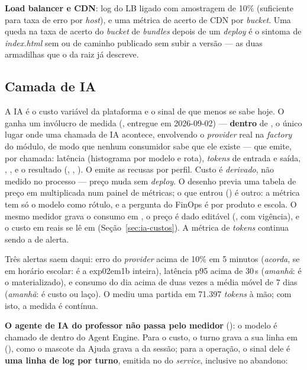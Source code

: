 \textbf{Load balancer e CDN}: log do LB ligado com amostragem de 10\%
(suficiente para taxa de erro por \emph{host}), e uma métrica de acerto de
CDN por \emph{bucket}. Uma queda na taxa de acerto do \emph{bucket} de
\emph{bundles} depois de um \emph{deploy} é o sintoma de \emph{index.html}
sem  ou de caminho publicado sem subir a versão --- as
duas armadilhas que o  da raiz já descreve.

\subsection{Camada de IA}

A IA é o custo variável da plataforma e o sinal de que menos se sabe hoje.
O  ganha um invólucro de medida (,
entregue em 2026-09-02) --- \textbf{dentro} de , o único
lugar onde uma chamada de IA acontece, envolvendo o \emph{provider} real na
\emph{factory} do módulo, de modo que nenhum consumidor sabe que ele existe
--- que emite, por chamada: latência (histograma por modelo e rota), \emph{tokens}
de entrada e saída, , ,  e o
resultado (, , ). O 
emite as recusas por perfil. Custo é \emph{derivado}, não medido no processo
--- preço muda sem \emph{deploy}. O desenho previa uma tabela de preço em
 multiplicada num painel de métricas; o que entrou
() é outro: a métrica tem só o modelo como rótulo, e a pergunta
do FinOps é por produto e escola. O mesmo medidor grava o consumo em
, o preço é dado editável (, com
vigência), e o custo em reais se lê em 
(Seção~\ref{sec:ia-custos}). A métrica de \emph{tokens} continua sendo a de
alerta.

Três alertas saem daqui: erro do \emph{provider} acima de 10\% em 5 minutos
(\emph{acorda}, se em horário escolar: é a exp02em1b inteira), latência p95
acima de 30\,s (\emph{amanhã}: é o  materializado), e consumo do
dia acima de duas vezes a média móvel de 7 dias (\emph{amanhã}: é custo ou
laço). O  mediu uma partida em 71.397 \emph{tokens} à mão; com isto,
a medida é contínua.

\textbf{O agente de IA do professor não passa pelo medidor} (): o
modelo é chamado de dentro do Agent Engine. Para o custo, o turno grava a sua
linha em  (), como o mascote da Ajuda
grava a da sessão; para a operação, o sinal dele é \textbf{uma linha de
log por turno}, emitida no  do \emph{service}, inclusive no abandono:

